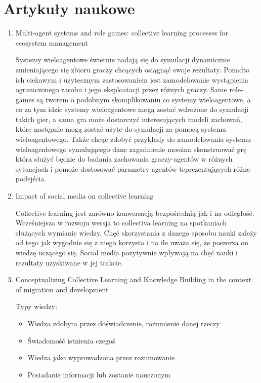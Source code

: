 \documentclass[11pt]{aghdpl}
\begin{document}
\section{Artykuły naukowe}
\begin{enumerate}

\item Multi-agent systems and role games: collective learning processes for ecosystem management\cite{MultiAgentSystemsAndRoleGamesCollectiveLearningProcessesForEcosystemManagement}

Systemy wieloagentowe świetnie nadają się do symulacji dynamicznie zmieniającego się zbioru graczy chcących osiągnąć swoje rezultaty. Ponadto ich ciekawym i użytecznym zastosowaniem jest zamodelowanie wystąpienia ograniczonego zasobu i jego eksploatacji przez różnych graczy. Same role-games są tworem o podobnym skomplikowaniu co systemy wieloagentowe, a co za tym idzie systemy wieloagentowe mogą zostać wdrożone do symulacji takich gier, a sama gra może dostarczyć interesujących modeli zachowań, które następnie mogą zostać użyte do symulacji za pomocą systemu wieloagentowego.
Także chcąc zdobyć przykłady do zamodelowania systemu wieloagentowego symulującego dane zagadnienie moożna skonstruować grę która służyć będzie do badania zachowania graczy-agentów w różnych sytuacjach i pomoże dostosować parametry agentów teprezentujących różne podejścia.


\item Impact of social media on collective learning \cite{ImpactOfSocialMediaOnCollectiveLearning}

Collective learning jest zarówno konwersacją bezpośrednią jak i na odległość. Wcześniejsza w rozwoju wersja to collectiva learning na spotkaniach służących wymianie wiedzy. Chęć skorzystania z danego sposobu nauki zależy od tego jak wygodnie się z niego korzysta i na ile uważa się, że poszerza on wiedzę uczącego się. Social media pozytywnie wpływają na chęć nauki i rezultaty uzyskiwane w jej trakcie.

\item Conceptualizing Collective Learning and Knowledge Building in the context of migration and development \cite{ConceptualizingCollectiveLearning}

Typy wiedzy:

\begin{itemize}
        \item Wiedza zdobyta przez doświadczenie, rozumienie danej rzeczy
        \item Świadomość istnienia czegoś
        \item Wiedza jako wyprowadzona przez rozumowanie
        \item Posiadanie informacji lub zostanie nauczonym
\end{itemize}


\end{enumerate}
\end{document}
